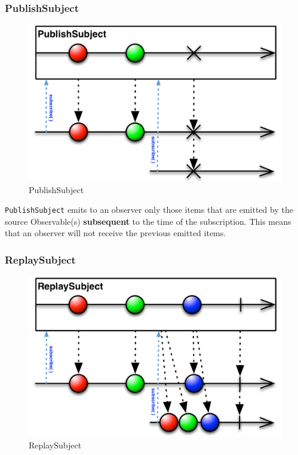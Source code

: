 \subsubsection{PublishSubject}\label{publishsubject}

\begin{figure}[htbp]
\centering
\includegraphics[scale=0.5]{imgs/pubsubj.png}
\caption{PublishSubject}
\end{figure}

\texttt{PublishSubject} emits to an observer only those items that are
emitted by the source Observable(s) \textbf{subsequent} to the time of
the subscription. This means that an observer will not receive the
previous emitted items.

\subsubsection{ReplaySubject}\label{replaysubject}

\begin{figure}[htbp]
\centering
\includegraphics[scale=0.5]{imgs/replaysub.png}
\caption{ReplaySubject}
\end{figure}


